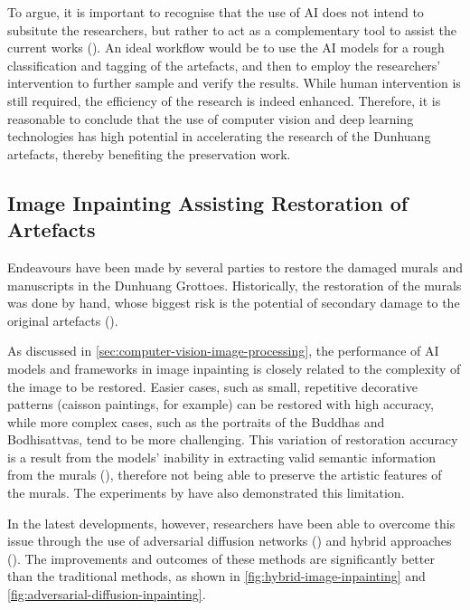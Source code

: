 To argue, it is important to recognise that the use of AI does not intend to subsitute the researchers, but rather
to act as a complementary tool to assist the current works
(). An ideal workflow would be to use the AI models for
a rough classification and tagging of the artefacts, and then to employ the researchers' intervention to further
sample and verify the results. While human intervention is still required, the efficiency of the research is indeed
enhanced. Therefore, it is reasonable to conclude that the use of computer vision and deep learning technologies
has high potential in accelerating the research of the Dunhuang artefacts, thereby benefiting the preservation
work.

\subsection{Image Inpainting Assisting Restoration of Artefacts}
\label{sec:image-inpainting-restoration}

Endeavours have been made by several parties to restore the damaged murals and manuscripts in the Dunhuang
Grottoes. Historically, the restoration of the murals was done by hand, whose biggest risk is the potential
of secondary damage to the original artefacts ().

As discussed in \cref{sec:computer-vision-image-processing}, the performance of AI models and frameworks in
image inpainting is closely related to the complexity of the image to be restored. Easier cases, such as
small, repetitive decorative patterns (caisson paintings, for example) can be restored with high accuracy,
while more complex cases, such as the portraits of the Buddhas and Bodhisattvas, tend to be more challenging.
This variation of restoration accuracy is a result from the models' inability in extracting valid semantic
information from the murals (), therefore not being able
to preserve the artistic features of the murals. The experiments by  have
also demonstrated this limitation.

In the latest developments, however, researchers have been able to overcome this issue through the use of
adversarial diffusion networks () and hybrid approaches
(). The improvements and outcomes of these methods are significantly
better than the traditional methods, as shown in \cref{fig:hybrid-image-inpainting} and
\cref{fig:adversarial-diffusion-inpainting}.

